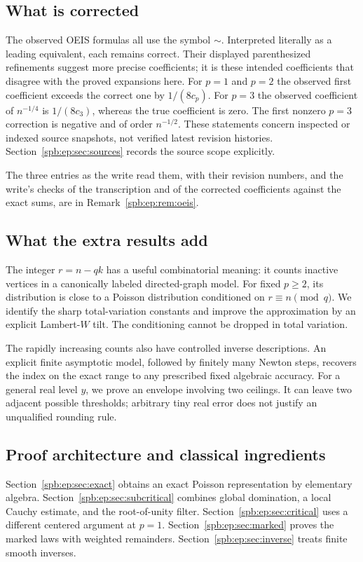 \subsection{What is corrected}
The observed OEIS formulas all use the symbol $\sim$. Interpreted literally
as a leading equivalent, each remains correct. Their displayed
parenthesized refinements suggest more precise coefficients; it is these
intended coefficients that disagree with the proved expansions here.
For $p=1$ and $p=2$ the observed first coefficient exceeds the correct one
by $1/(8c_p)$. For $p=3$ the observed coefficient of $n^{-1/4}$ is
$1/(8c_3)$, whereas the true coefficient is zero.
The first nonzero $p=3$ correction is negative and of order $n^{-1/2}$.
These statements concern inspected or indexed source snapshots, not
verified latest revision histories. Section~\ref{spb:ep:sec:sources} records the
source scope explicitly.
\begin{writenote}[7 October 2026]
The three entries as the write read them, with their revision numbers, and
the write's checks of the transcription and of the corrected coefficients
against the exact sums, are in Remark~\ref{spb:ep:rem:oeis}.
\end{writenote}

\subsection{What the extra results add}
The integer $r=n-qk$ has a useful combinatorial meaning: it counts inactive
vertices in a canonically labeled directed-graph model. For fixed $p\ge2$,
its distribution is close to a Poisson distribution conditioned on
$r\equiv n\pmod q$. We identify the sharp total-variation constants and
improve the approximation by an explicit Lambert-$W$ tilt. The conditioning
cannot be dropped in total variation.

The rapidly increasing counts also have controlled inverse descriptions.
An explicit finite asymptotic model, followed by finitely many Newton steps,
recovers the index on the exact range to any prescribed fixed algebraic
accuracy. For a general real level $y$, we prove an envelope involving two
ceilings. It can leave two adjacent possible thresholds; arbitrary tiny
real error does not justify an unqualified rounding rule.

\subsection{Proof architecture and classical ingredients}
Section~\ref{spb:ep:sec:exact} obtains an exact Poisson representation by elementary
algebra. Section~\ref{spb:ep:sec:subcritical} combines global domination, a local
Cauchy estimate, and the root-of-unity filter. Section~\ref{spb:ep:sec:critical}
uses a different centered argument at $p=1$.
Section~\ref{spb:ep:sec:marked} proves the marked laws with weighted remainders.
Section~\ref{spb:ep:sec:inverse} treats finite smooth inverses.

